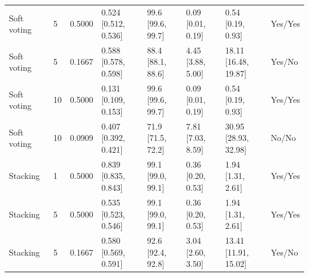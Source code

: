 \begin{longtable}{llllllll}
Soft voting & 5 & 0.5000 & \shortstack{{0.524} \\ {[0.512, 0.536]}} & \shortstack{{99.6} \\ {[99.6, 99.7]}} & \shortstack{{0.09} \\ {[0.01, 0.19]}} & \shortstack{{0.54} \\ {[0.19, 0.93]}} & Yes/Yes \\
Soft voting & 5 & 0.1667 & \shortstack{{0.588} \\ {[0.578, 0.598]}} & \shortstack{{88.4} \\ {[88.1, 88.6]}} & \shortstack{{4.45} \\ {[3.88, 5.00]}} & \shortstack{{18.11} \\ {[16.48, 19.87]}} & Yes/No \\
Soft voting & 10 & 0.5000 & \shortstack{{0.131} \\ {[0.109, 0.153]}} & \shortstack{{99.6} \\ {[99.6, 99.7]}} & \shortstack{{0.09} \\ {[0.01, 0.19]}} & \shortstack{{0.54} \\ {[0.19, 0.93]}} & Yes/Yes \\
Soft voting & 10 & 0.0909 & \shortstack{{0.407} \\ {[0.392, 0.421]}} & \shortstack{{71.9} \\ {[71.5, 72.2]}} & \shortstack{{7.81} \\ {[7.03, 8.59]}} & \shortstack{{30.95} \\ {[28.93, 32.98]}} & No/No \\
Stacking & 1 & 0.5000 & \shortstack{{0.839} \\ {[0.835, 0.843]}} & \shortstack{{99.1} \\ {[99.0, 99.1]}} & \shortstack{{0.36} \\ {[0.20, 0.53]}} & \shortstack{{1.94} \\ {[1.31, 2.61]}} & Yes/Yes \\
Stacking & 5 & 0.5000 & \shortstack{{0.535} \\ {[0.523, 0.546]}} & \shortstack{{99.1} \\ {[99.0, 99.1]}} & \shortstack{{0.36} \\ {[0.20, 0.53]}} & \shortstack{{1.94} \\ {[1.31, 2.61]}} & Yes/Yes \\
Stacking & 5 & 0.1667 & \shortstack{{0.580} \\ {[0.569, 0.591]}} & \shortstack{{92.6} \\ {[92.4, 92.8]}} & \shortstack{{3.04} \\ {[2.60, 3.50]}} & \shortstack{{13.41} \\ {[11.91, 15.02]}} & Yes/No \\

\end{longtable}
